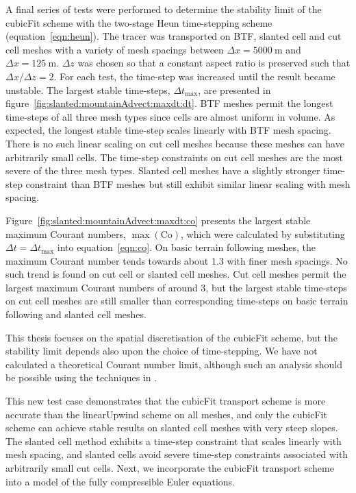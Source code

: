 A final series of tests were performed to determine the stability limit of the cubicFit scheme with the two-stage Heun time-stepping scheme (equation~\ref{eqn:heun}).
The tracer was transported on BTF, slanted cell and cut cell meshes with a variety of mesh spacings between $\Delta x = \SI{5000}{\meter}$ and $\Delta x = \SI{125}{\meter}$.  $\Delta z$ was chosen so that a constant aspect ratio is preserved such that $\Delta x / \Delta z = 2$.
For each test, the time-step was increased until the result became unstable.  The largest stable time-steps, $\Delta t_\mathrm{max}$, are presented in figure~\ref{fig:slanted:mountainAdvect:maxdt:dt}.
BTF meshes permit the longest time-steps of all three mesh types since cells are almost uniform in volume.  As expected, the longest stable time-step scales linearly with BTF mesh spacing.
There is no such linear scaling on cut cell meshes because these meshes can have arbitrarily small cells.  The time-step constraints on cut cell meshes are the most severe of the three mesh types.  Slanted cell meshes have a slightly stronger time-step constraint than BTF meshes but still exhibit similar linear scaling with mesh spacing.

Figure~\ref{fig:slanted:mountainAdvect:maxdt:co} presents the largest stable maximum Courant numbers, $\max(\mathrm{Co})$, which were calculated by substituting $\Delta t = \Delta t_\mathrm{max}$ into equation~\eqref{eqn:co}.
On basic terrain following meshes, the maximum Courant number tends towards about \num{1.3} with finer mesh spacings.
No such trend is found on cut cell or slanted cell meshes.
Cut cell meshes permit the largest maximum Courant numbers of around \num{3}, but the largest stable time-steps on cut cell meshes are still smaller than corresponding time-steps on basic terrain following and slanted cell meshes.

This thesis focuses on the spatial discretisation of the cubicFit scheme, but the stability limit depends also upon the choice of time-stepping.  We have not calculated a theoretical Courant number limit, although such an analysis should be possible using the techniques in \citep{baldauf2008}.

This new test case demonstrates that the cubicFit transport scheme is more accurate than the linearUpwind scheme on all meshes, and only the cubicFit scheme can achieve stable results on slanted cell meshes with very steep slopes.
The slanted cell method exhibits a time-step constraint that scales linearly with mesh spacing, and slanted cells avoid severe time-step constraints associated with arbitrarily small cut cells.
Next, we incorporate the cubicFit transport scheme into a model of the fully compressible Euler equations.
